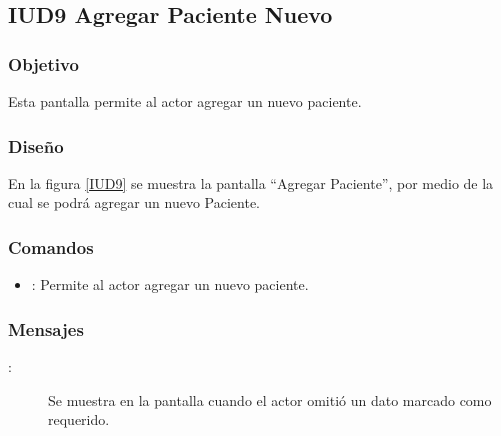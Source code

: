 \subsection{IUD9 Agregar Paciente Nuevo}
 
\subsubsection{Objetivo}

    Esta pantalla permite al actor agregar un nuevo paciente.

\subsubsection{Diseño}

    En la figura \ref{IUD9} se muestra la pantalla ``Agregar Paciente'', por medio de la cual se podrá agregar un nuevo Paciente. \\


\subsubsection{Comandos}
\begin{itemize}
    \item {}: Permite al actor agregar un nuevo paciente.
    
\end{itemize}

\subsubsection{Mensajes}

\begin{description}
    \item[:] Se muestra en la pantalla  cuando el actor omitió un dato marcado como requerido.
    
\end{description}
